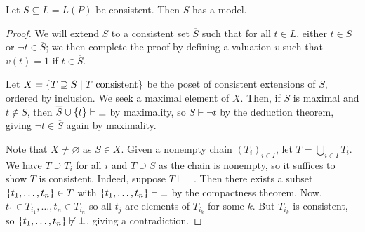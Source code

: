 \begin{theorem}
    Let \( S \subseteq L = L(P) \) be consistent.
    Then \( S \) has a model.
\end{theorem}
\begin{proof}
    We will extend \( S \) to a consistent set \( \overline S \) such that for all \( t \in L \), either \( t \in S \) or \( \neg t \in \overline S \); we then complete the proof by defining a valuation \( v \) such that \( v(t) = 1 \) if \( t \in \overline S \).
    
    Let \( X = \qty{T \supseteq S \mid T \text{ consistent}} \) be the poset of consistent extensions of \( S \), ordered by inclusion.
    We seek a maximal element of \( X \).
    Then, if \( \overline S \) is maximal and \( t \not\in \overline S \), then \( \overline S \cup \qty{t} \vdash \bot \) by maximality, so \( \overline S \vdash \neg t \) by the deduction theorem, giving \( \neg t \in \overline S \) again by maximality.

    Note that \( X \neq \varnothing \) as \( S \in X \).
    Given a nonempty chain \( (T_i)_{i \in I} \), let \( T = \bigcup_{i \in I} T_i \).
    We have \( T \supseteq T_i \) for all \( i \) and \( T \supseteq S \) as the chain is nonempty, so it suffices to show \( T \) is consistent.
    Indeed, suppose \( T \vdash \bot \).
    Then there exists a subset \( \qty{t_1, \dots, t_n} \in T \) with \( \qty{t_1, \dots, t_n} \vdash \bot \) by the compactness theorem.
    Now, \( t_1 \in T_{i_1}, \dots, t_n \in T_{i_n} \) so all \( t_j \) are elements of \( T_{i_k} \) for some \( k \).
    But \( T_{i_k} \) is consistent, so \( \qty{t_1, \dots, t_n} \not\vdash \bot \), giving a contradiction.
\end{proof}
